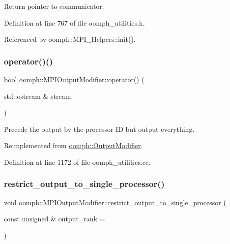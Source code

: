 Return pointer to communicator. 



Definition at line 767 of file oomph\+\_\+utilities.\+h.



Referenced by oomph\+::\+M\+P\+I\+\_\+\+Helpers\+::init().

\mbox{\label{classoomph_1_1MPIOutputModifier_a982af85269a497f384cdff7baf9487a1}} 
\subsubsection{\texorpdfstring{operator()()}{operator()()}}
{\footnotesize\ttfamily bool oomph\+::\+M\+P\+I\+Output\+Modifier\+::operator() (\begin{DoxyParamCaption}\item[{std\+::ostream \&}]{stream }\end{DoxyParamCaption})\hspace{0.3cm}{\ttfamily [virtual]}}



Precede the output by the processor ID but output everything. 



Reimplemented from \hyperlink{classoomph_1_1OutputModifier_ae2d5a2d19865858377b5113ca84aa423}{oomph\+::\+Output\+Modifier}.



Definition at line 1172 of file oomph\+\_\+utilities.\+cc.

\mbox{\label{classoomph_1_1MPIOutputModifier_a5822d5ea7cd02753e5706ec790f2ff6e}} 
\subsubsection{\texorpdfstring{restrict\+\_\+output\+\_\+to\+\_\+single\+\_\+processor()}{restrict\_output\_to\_single\_processor()}}
{\footnotesize\ttfamily void oomph\+::\+M\+P\+I\+Output\+Modifier\+::restrict\+\_\+output\+\_\+to\+\_\+single\+\_\+processor (\begin{DoxyParamCaption}\item[{const unsigned \&}]{output\+\_\+rank = {} }\end{DoxyParamCaption})\hspace{0.3cm}{\ttfamily [inline]}}

